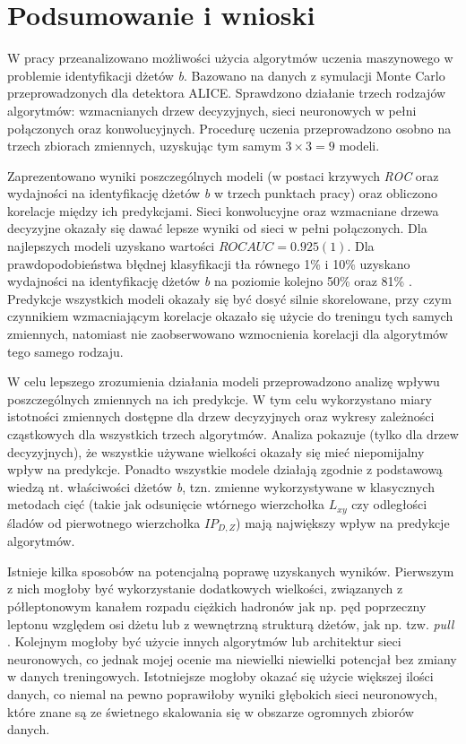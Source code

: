 \section{Podsumowanie i wnioski}
\label{sec:podsumowanie}

W pracy przeanalizowano możliwości użycia algorytmów uczenia maszynowego w problemie identyfikacji dżetów \textit{b}.
Bazowano na danych z symulacji Monte Carlo przeprowadzonych dla detektora ALICE.
Sprawdzono działanie trzech rodzajów algorytmów: wzmacnianych drzew decyzyjnych, sieci neuronowych w pełni połączonych oraz konwolucyjnych.
Procedurę uczenia przeprowadzono osobno na trzech zbiorach zmiennych, uzyskując tym samym $3\times3=9$ modeli. 

Zaprezentowano wyniki poszczególnych modeli (w postaci krzywych \textit{ROC} oraz wydajności na identyfikację  dżetów \textit{b} w trzech punktach pracy) oraz obliczono korelacje między ich predykcjami.
Sieci konwolucyjne oraz wzmacniane drzewa decyzyjne okazały się dawać lepsze wyniki od sieci w pełni połączonych.
Dla najlepszych modeli uzyskano wartości $ROC AUC = 0.925(1)$.
Dla prawdopodobieństwa błędnej klasyfikacji tła równego 1\% i 10\% uzyskano wydajności na identyfikację dżetów \textit{b} na poziomie kolejno 50\% oraz 81\% .
Predykcje wszystkich modeli okazały się być dosyć silnie skorelowane, przy czym czynnikiem wzmacniającym korelacje okazało się użycie do treningu tych samych zmiennych, natomiast nie zaobserwowano wzmocnienia korelacji dla algorytmów tego samego rodzaju.

W celu lepszego zrozumienia działania modeli przeprowadzono analizę wpływu poszczególnych zmiennych na ich predykcje. W tym celu wykorzystano miary istotności zmiennych dostępne dla drzew decyzyjnych oraz wykresy zależności cząstkowych dla wszystkich trzech algorytmów.
Analiza pokazuje (tylko dla drzew decyzyjnych), że wszystkie używane wielkości okazały się mieć niepomijalny wpływ na predykcje.
Ponadto wszystkie modele działają zgodnie z podstawową wiedzą nt. właściwości dżetów \textit{b}, tzn. zmienne wykorzystywane w klasycznych metodach cięć (takie jak odsunięcie wtórnego wierzchołka $L_{xy}$ czy odległości śladów od pierwotnego wierzchołka $IP_{D,Z}$) mają największy wpływ na predykcje algorytmów. 

Istnieje kilka sposobów na potencjalną poprawę uzyskanych wyników. 
Pierwszym z nich mogłoby być wykorzystanie dodatkowych wielkości, związanych z półleptonowym kanałem rozpadu ciężkich hadronów jak np. pęd poprzeczny leptonu względem osi dżetu lub z wewnętrzną strukturą dżetów, jak np. tzw. \textit{pull} \cite{Gallicchio:2010sw}. 
Kolejnym mogłoby być użycie innych algorytmów lub architektur sieci neuronowych, co jednak mojej ocenie ma niewielki niewielki potencjał bez zmiany w danych treningowych.
Istotniejsze mogłoby okazać się użycie większej ilości danych, co niemal na pewno poprawiłoby wyniki głębokich sieci neuronowych, które znane są ze świetnego skalowania się w obszarze ogromnych zbiorów danych.

